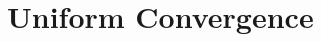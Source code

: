 \documentclass[british,11pt,a4paper]{report}
\begin{document}
\maketitle
\tableofcontents

\chapter{Uniform Convergence}

\end{document}
